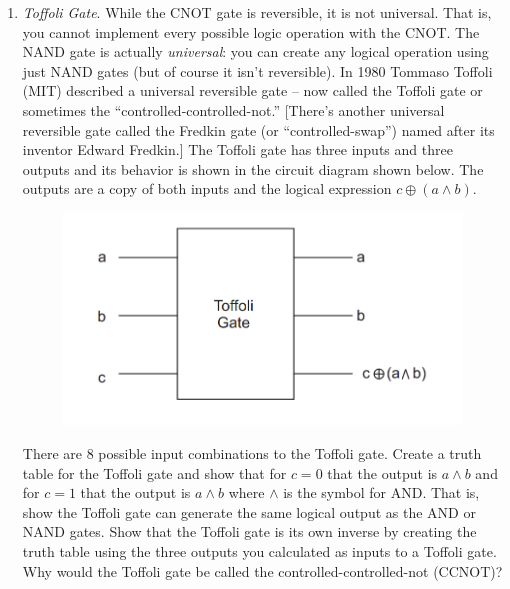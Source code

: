 \documentclass{book}
\theoremstyle{definition}
\begin{document}
\begin{enumerate}
	
	\item \textit{Toffoli Gate}. While the CNOT gate is reversible, it is not universal. That is, you cannot
	implement every possible logic operation with the CNOT. The NAND gate is actually
	\textit{universal}: you can create any logical operation using just NAND gates (but of course
	it isn’t reversible). In 1980 Tommaso Toffoli (MIT) described a universal reversible
	gate – now called the Toffoli gate or sometimes the ``controlled-controlled-not.'' [There’s
	another universal reversible gate called the Fredkin gate (or ``controlled-swap'') named
	after its inventor Edward Fredkin.] The Toffoli gate has three inputs and three outputs
	and its behavior is shown in the circuit diagram shown below. The outputs are a copy
	of both inputs and the logical expression $c \oplus (a \land b)$.
	\begin{figure}[!htb]
		\centering
		\includegraphics[scale=0.25]{toffoli}
	\end{figure}
	There are 8 possible input combinations to the Toffoli gate. Create a truth table for the
	Toffoli gate and show that for $c = 0$ that the output is $a \land b$ and for $c = 1$ that the output
	is $a \land b$ where $\land$ is the symbol for AND. That is, show the Toffoli gate can generate the
	same logical output as the AND or NAND gates.
	Show that the Toffoli gate is its own inverse by creating the truth table using the three
	outputs you calculated as inputs to a Toffoli gate.
	Why would the Toffoli gate be called the controlled-controlled-not (CCNOT)?
\end{enumerate}
\end{document}
